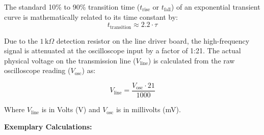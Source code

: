The standard 10\% to 90\% transition time ($t_{\text{rise}}$ or $t_{\text{fall}}$) of an exponential transient curve is mathematically related to its time constant by:
\begin{equation}
    t_{\text{transition}} \approx 2.2 \cdot \tau
\end{equation}

Due to the $1\,\text{k}\Omega$ detection resistor on the line driver board, the high-frequency signal is attenuated at the oscilloscope input by a factor of 1:21. The actual physical voltage on the transmission line ($V_{\text{line}}$) is calculated from the raw oscilloscope reading ($V_{\text{osc}}$) as:

\begin{equation}
    V_{\text{line}} = \frac{V_{\text{osc}} \cdot 21}{1000}
\end{equation}

Where $V_{\text{line}}$ is in Volts (V) and $V_{\text{osc}}$ is in millivolts (mV).

\vspace{1em}
\textbf{Exemplary Calculations:}

